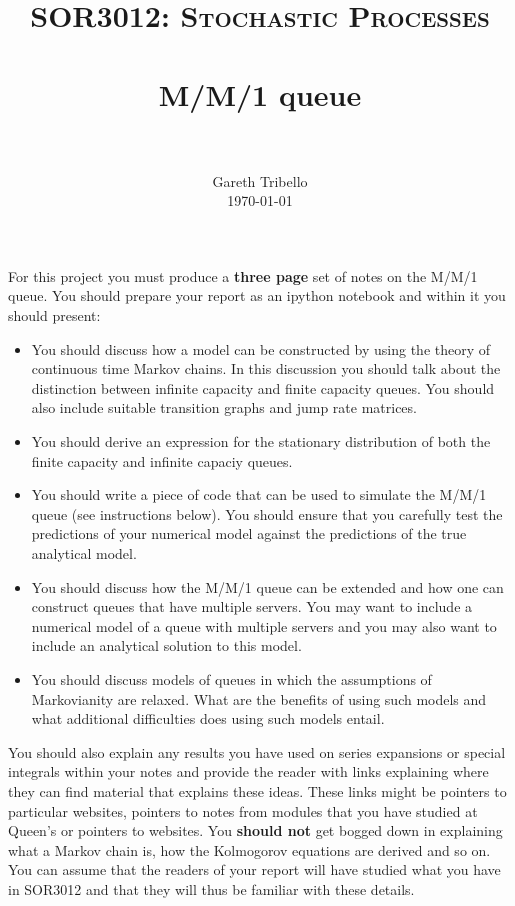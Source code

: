 \documentclass[paper=a4, fontsize=11pt]{scrartcl}
\title{\usefont{OT1}{bch}{b}{n} \normalfont \normalsize \textsc{SOR3012:
Stochastic Processes} \\ [25pt] \horrule{0.5pt} \\[0.4cm] 
\huge M/M/1 queue \\
\horrule{2pt} \\[0.25cm]
}
\author{ \normalfont
\normalsize
        Gareth Tribello \\[-3pt] \normalsize
        \today
}
\date{}
\numberwithin{equation}{section}
\numberwithin{figure}{section}
\numberwithin{table}{section}
\begin{document}
\maketitle

For this project you must produce a {\bf three page} set of notes on the M/M/1 queue.  You should prepare your report as an ipython notebook and within it you should present:

\begin{itemize}
\item You should discuss how a model can be constructed by using the theory of continuous time Markov chains.  In this discussion you should talk about the distinction between infinite 
capacity and finite capacity queues.  You should also include suitable transition graphs and jump rate matrices.

\item You should derive an expression for the stationary distribution of both the finite capacity and infinite capaciy queues.

\item You should write a piece of code that can be used to simulate the M/M/1 queue (see instructions below).  You should ensure that you carefully test the predictions of your numerical
model against the predictions of the true analytical model.  

\item You should discuss how the M/M/1 queue can be extended and how one can construct queues that have multiple servers.  You may want to include a numerical model of a queue with multiple servers
and you may also want to include an analytical solution to this model.

\item You should discuss models of queues in which the assumptions of Markovianity are relaxed.  What are the benefits of using such models and what additional difficulties does using such models entail.

\end{itemize}

You should also explain any results you have used on series expansions or special integrals within your notes and provide the reader with links explaining where they can find material that explains 
these ideas.  These links might be pointers to particular websites, pointers to notes from modules that you have studied at Queen's or pointers to websites.  You {\bf should not} get bogged down in 
explaining what a Markov chain is, how the Kolmogorov equations are derived and so on. You can assume that the readers of your report will have studied what you have in SOR3012 and that they will thus
be familiar with these details.
\end{document}
